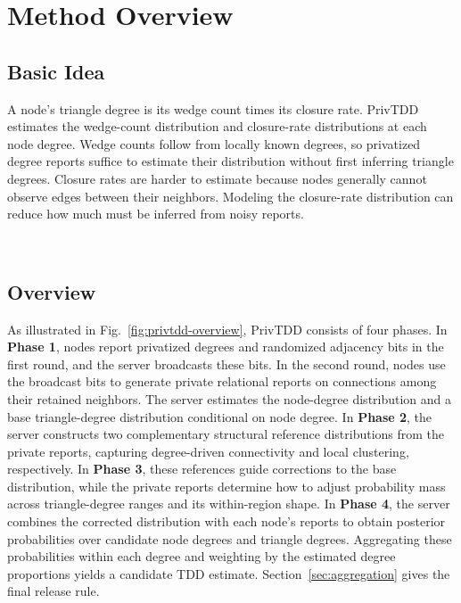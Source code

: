 \section{Method Overview}\label{sec:method}

\subsection{Basic Idea}
A node's triangle degree is its wedge count times its closure rate.
PrivTDD estimates the wedge-count distribution and closure-rate distributions at each node degree.
Wedge counts follow from locally known degrees, so privatized degree reports suffice to estimate their distribution without first inferring triangle degrees.
Closure rates are harder to estimate because nodes generally cannot observe edges between their neighbors.
Modeling the closure-rate distribution can reduce how much must be inferred from noisy reports.

\
\subsection{Overview}
\label{sec:overview}
As illustrated in Fig.~\ref{fig:privtdd-overview}, PrivTDD consists of four phases.
In \textbf{Phase 1}, nodes report privatized degrees and randomized adjacency bits in the first round, and the server
broadcasts these bits.
 In the second round, nodes use the broadcast bits to generate private relational reports on
connections among their retained neighbors. The server estimates the node-degree distribution and a base triangle-degree distribution conditional on node degree.
In \textbf{Phase 2}, the server constructs two complementary
structural reference distributions from the private reports,
capturing degree-driven connectivity and local clustering,
respectively.
In \textbf{Phase 3}, these references guide corrections to
the base distribution, while the private reports determine
how to adjust probability mass across triangle-degree ranges
and its within-region shape.
In \textbf{Phase 4}, the server combines the corrected
distribution with each node's reports to obtain posterior
probabilities over candidate node degrees and triangle degrees.
Aggregating these probabilities within each degree and
weighting by the estimated degree proportions yields
a candidate TDD estimate. Section~\ref{sec:aggregation} gives the final release rule.


